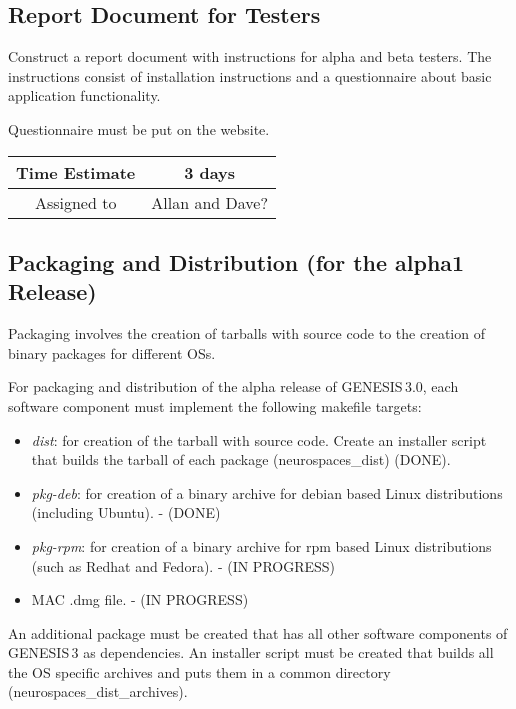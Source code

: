 \documentclass[12pt]{article}
\begin{document}
\subsection{Report Document for Testers}

Construct a report document with instructions for alpha and beta
testers.  The instructions consist of installation instructions and a
questionnaire about basic application functionality.

Questionnaire must be put on the website.


\begin{center}
  \vspace{5mm}
  \centering
  \begin{tabular}{|c|c|}
    \hline
    Time Estimate
    & 3 days \\
    \hline
    Assigned to
    &  Allan and Dave? \\
    \hline
  \end{tabular}
\end{center}


\subsection{Packaging and Distribution (for the alpha1 Release)}

Packaging involves the creation of tarballs with source code to the
creation of binary packages for different OSs.

For packaging and distribution of the alpha release of GENESIS\,3.0,
each software component must implement the following makefile targets:

\begin{itemize}
\item {\it dist}: for creation of the tarball with source code.
  Create an installer script that builds the tarball of each package
  (neurospaces\_dist) (DONE).
\item {\it pkg-deb}: for creation of a binary archive for debian based
  Linux distributions (including Ubuntu). - (DONE)
\item {\it pkg-rpm}: for creation of a binary archive for rpm based Linux
  distributions (such as Redhat and Fedora). - (IN PROGRESS)
\item MAC .dmg file. - (IN PROGRESS)
\end{itemize}

An additional package must be created that has all other software
components of GENESIS\,3 as dependencies.  An installer script must
be created that builds all the OS specific archives and puts them in a
common directory (neurospaces\_dist\_archives).
\end{document}
